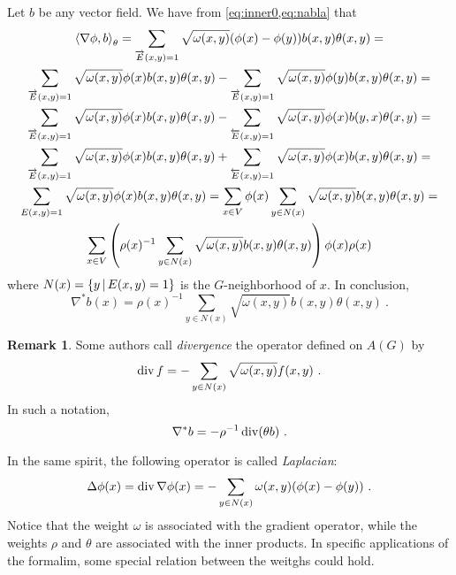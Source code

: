 \documentclass[12pt,a4paper]{amsart}
\theoremstyle{definition}
\newtheorem{remark}{Remark}
\begin{document}
Let $b$ be any vector field. We have from \cref{eq:inner0,eq:nabla} that
\begin{multline*}
  \left\langle\nabla \phi,b\right\rangle_{\theta} = \sum_{\overrightarrow E(x,y)=1}
  \sqrt{\omega(x,y)}  (\phi(x) - \phi(y)) b(x,y) \theta(x,y) = \\
  \sum_{\overrightarrow E(x,y)=1} \sqrt{\omega(x,y)} \phi(x) b(x,y)
  \theta(x,y) - \sum_{\overrightarrow E(x,y)=1}
  \sqrt{\omega(x,y)}  \phi(y) b(x,y) \theta(x,y) = \\
  \sum_{\overrightarrow E(x,y)=1} \sqrt{\omega(x,y)} \phi(x) b(x,y)
  \theta(x,y) - \sum_{\overleftarrow E(x,y)=1}
  \sqrt{\omega(x,y)}  \phi(x) b(y,x) \theta(x,y) = \\
  \sum_{\overrightarrow E(x,y)=1} \sqrt{\omega(x,y)} \phi(x) b(x,y)
  \theta(x,y) + \sum_{\overleftarrow E(x,y)=1}
  \sqrt{\omega(x,y)}  \phi(x) b(x,y) \theta(x,y) = \\
  \sum_{E(x,y)=1} \sqrt{\omega(x,y)}  \phi(x) b(x,y) \theta(x,y) = 
  \sum_{x \in V} \phi(x) \sum_{y \in N(x)}
  \sqrt{\omega(x,y)}  b(x,y) \theta(x,y) = \\
  \sum_{x \in V} \left(\rho(x)^{-1} \sum_{y \in N(x)}
  \sqrt{\omega(x,y)}  b(x,y) \theta(x,y) \right) \phi(x) \rho(x)
\end{multline*}
where $N(x) = \left\{y \, \middle| \, E(x,y)=1 \right\}$ is the $G$-neighborhood of $x$. In
conclusion,
\begin{equation}\label{eq:nablastar}
  \nabla^* b(x) = \rho(x)^{-1} \sum_{y \in N(x)}
  \sqrt{\omega(x,y)}  b(x,y) \theta(x,y) \ .
\end{equation}

\begin{remark}
  Some authors call \emph{divergence} the operator defined on $A(G)$ by
\begin{equation*}
  \operatorname*{div} f = - \sum_{y \in N(x)} \sqrt{\omega(x,y)} f(x,y) \ .
\end{equation*}
In such a notation,
\begin{equation*}
  \nabla^* b = - \rho^{-1} \Div(\theta b) \ . 
\end{equation*}

In the same spirit, the following operator is called \emph{Laplacian}:
\begin{equation*}
  \Delta \phi (x) = \operatorname*{div} \nabla \phi (x)= - \sum_{y \in N(x)}
  \omega(x,y) (\phi(x)-\phi(y)) \ .
\end{equation*}
Notice that the weight $\omega$ is associated with the gradient
operator, while the weights $\rho$ and $\theta$ are associated with
the inner products. In specific applications of the formalim, some
special relation between the weitghs could hold.
\end{remark}
\end{document}
